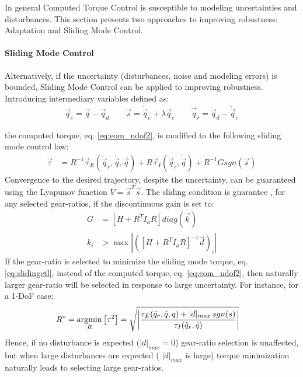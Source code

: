In general Computed Torque Control is susceptible to modeling uncertainties and disturbances. This section presents two approaches to improving robustness: Adaptation and Sliding Mode Control. 


\paragraph{Sliding Mode Control}

Alternatively, if the uncertainty (disturbances, noise and modeling errors) is bounded, Sliding Mode Control can be applied to improving robustness. %
Introducing intermediary variables defined as:
\begin{align}
	\vec{q}_e        = \vec{q} - \vec{q}_d  \quad \quad
	\vec{s}          = \dot{\vec{q}}_e + \lambda \vec{q}_e \quad \quad
  \vec{\ddot{q}}_r = \ddot{\vec{q}}_d - \dot{\vec{q}}_e
 \label{eq:slidingvar}
\end{align}

the computed torque, eq. \eqref{eq:eom_ndof2}, is modified to the following sliding mode control law: 
\begin{align}
	\vec{\tau} &=  R^{-1} 
	\vec{\tau}_{E}(\ddot{\vec{q}}_r,\dot{\vec{q}},\vec{q}) 
	+ R 
	\vec{\tau}_{I}(\ddot{\vec{q}}_r,\dot{\vec{q}})
    + R^{-1} G sgn( \vec{s} ) 
 \label{eq:slidingctl}
\end{align}
Convergence to the desired trajectory, despite the uncertainty, can be guaranteed using the Lyapunov function $V=\vec{s}^T \vec{s}$. The sliding condition is guarantee \cite{asada_robot_1986}, for any selected gear-ratios, if the discontinuous gain is set to:
\begin{align}
	G &= \left[ H + R^T I_a R \right] diag( \vec{k} ) \\ k_{i} &> \max \left| \left(  \left[ H + R^T I_a R \right]^{-1} \vec{d} \right)_{i} \right|
 \label{eq:slidingcond}
\end{align}
%
If the gear-ratio is selected to minimize the sliding mode torque, eq. \eqref{eq:slidingctl}, instead of the computed torque, eq. \eqref{eq:eom_ndof2}, then naturally larger gear-ratio  will be selected in response to large uncertainty. For instance, for a 1-DoF case:
\begin{align}
	R^{*} &= \operatornamewithlimits{argmin}\limits_{R} \left[ \tau^2 \right] = \sqrt{ \left | \frac{\tau_{E}(\ddot{q}_r,\dot{q},q) + | d |_{max} \, sgn( s ) }{\tau_{I}(\ddot{q}_r,\dot{q})} \right |   } 
\label{eq:rstar_sliding}
\end{align}
Hence, if no disturbance is expected ($| d |_{max}=0$) gear-ratio selection is unaffected, but when large disturbances are expected ( $| d |_{max}$ is large) torque minimization naturally leads to selecting large gear-ratios.
%

